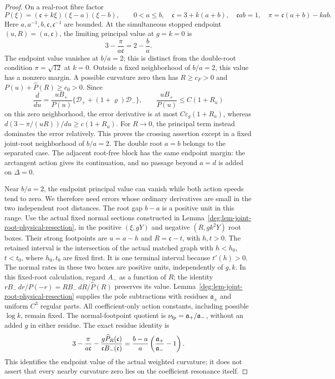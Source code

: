 \begin{proof}
On a real-root fibre factor
\[
 P(\xi)=(\mathfrak c+k\xi)(\xi-a)(\xi-b),\qquad
 0<a\le b,\quad
 \mathfrak c=3+k(a+b),\quad
 \mathfrak cab=1,\quad
 \pi=\mathfrak c(a+b)-kab.
\]
Here \(a,a^{-1},b,\mathfrak c,\mathfrak c^{-1}\) are bounded.
At the simultaneous stopped endpoint \((u,R)=(a,\mathfrak c)\),
the limiting principal value at \(g=k=0\) is
\[
 3-\frac{\pi}{a\mathfrak c}=2-\frac ba.
\]
The endpoint value vanishes at \(b/a=2\); this is distinct from
the double-root condition \(\pi=\sqrt{12}\) at \(k=0\).
Outside a fixed neighborhood of \(b/a=2\), this value has a
nonzero margin.  A possible curvature zero then has
\(R\ge c_F>0\) and \(P(u)+\widehat P(R)\ge c_0>0\).
Since
\[
 \frac{d}{du}
 =\frac{uB_+}{P(u)}
       \{\mathcal D_++(1+\varrho)\mathcal D_-\},
 \qquad
 \frac{uB_+}{P(u)}\le C(1+R_u)
\]
on this zero neighborhood, the error derivative is at most
\(C\varepsilon_g(1+R_u)\), whereas
\(d(3-\pi/(uR))/du\ge c(1+R_u)\).
For \(R\to0\), the principal term instead dominates the error
relatively.  This proves the crossing assertion except in a fixed
joint-root neighborhood of \(b/a=2\).  The double root \(a=b\)
belongs to the separated case.  The adjacent root-free block has the
same endpoint margin: the arctangent action gives its continuation,
and no passage beyond \(a=d\) is added on \(\Delta=0\).

Near \(b/a=2\), the endpoint principal value can vanish while both
action speeds tend to zero. We therefore need errors whose ordinary
derivatives are small in the two independent root distances.
The root gap \(b-a\) is a positive unit in this range.
Use the actual fixed normal sections constructed in
Lemma~\ref{deg:lem-joint-root-physical-resection}, in the positive
\((\xi,gY)\) and negative \((R,gk^2Y)\) root boxes.  Their strong footpoints
are \(u=a-h\) and \(R=\mathfrak c-t\), with \(h,t>0\).
The retained interval is the intersection of the actual matched graph
with \(h<h_0\), \(t<t_0\), where \(h_0,t_0\) are fixed first.
It is one terminal interval because \(t'(h)>0\).
The normal rates in these two boxes are positive units, independently
of \(g,k\).  In this fixed-root calculation, regard \(A_-\) as
a function of \(R\); the identity
\(rB_-\,dr/P(-r)=RB_-\,dR/\widehat P(R)\) preserves its value.
Lemma~\ref{deg:lem-joint-root-physical-resection} supplies the
pole subtractions with residues \(\mathfrak a_\pm\) and uniform
\(C^3\) regular parts. All coefficient-only action constants,
including possible \(\log k\), remain fixed. The normal-footpoint
quotient is \(\nu_{\rm fp}=\mathfrak a_+/\mathfrak a_-\), without
an added \(g\) in either residue.
The exact residue identity is
\begin{equation}
 3-{\pi\over a\mathfrak c}
 -{g\widehat P_R(\mathfrak c)\over
        \mathfrak cB_-(\mathfrak c)}
 ={b-a\over a}\left({\mathfrak a_+\over\mathfrak a_-}-1\right).
 \label{deg:quadratic-residue-identity}
\end{equation}
This identifies the endpoint value of the actual weighted curvature;
it does not assert that every nearby curvature zero lies on the
coefficient resonance itself.


\end{proof}
